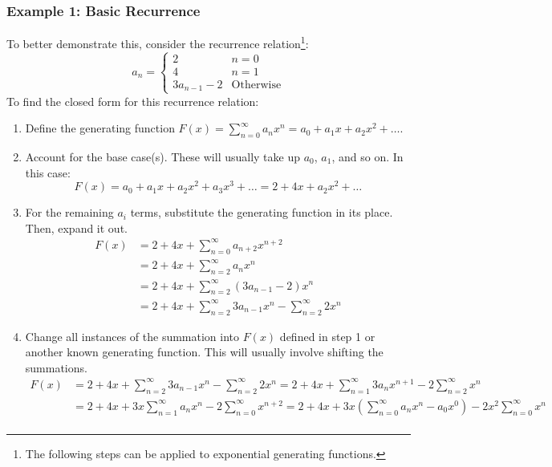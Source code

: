 \documentclass[letterpaper]{article}
\begin{document}
\subsubsection{Example 1: Basic Recurrence}
To better demonstrate this, consider the recurrence relation\footnote{The following steps can be applied to exponential generating functions.}:
\[a_n = \begin{cases}
    2 & n = 0 \\
    4 & n = 1 \\  
    3a_{n - 1} - 2 & \text{Otherwise}
\end{cases}\]
To find the closed form for this recurrence relation: 
\begin{enumerate}[(1)]
    \item Define the generating function $F(x) = \sum_{n = 0}^{\infty} a_n x^n = a_0 + a_1 x + a_2 x^2 + \dots$. 
    \item Account for the base case(s). These will usually take up $a_0$, $a_1$, and so on. In this case:
    \[F(x) = \boxed{a_0 + a_1 x} + a_2 x^2 + a_3 x^3 + \dots = \boxed{2 + 4x} + a_2 x^2 + \dots\]
    \item For the remaining $a_i$ terms, substitute the generating function in its place. Then, expand it out. 
    \begin{equation*}
        \begin{aligned}
            F(x) &= 2 + 4x + \boxed{\sum_{n = 0}^{\infty} a_{n + 2} x^{n + 2}} \\ 
                &= 2 + 4x + \boxed{\sum_{n = 2}^{\infty} a_{n} x^{n}} \\ 
                &= 2 + 4x + \boxed{\sum_{n = 2}^{\infty} (3a_{n - 1} - 2) x^{n}} \\ 
                &= 2 + 4x + \boxed{\sum_{n = 2}^{\infty} 3a_{n - 1} x^n - \sum_{n = 2}^{\infty} 2x^n}
        \end{aligned}
    \end{equation*}
    \item Change all instances of the summation into $F(x)$ defined in step 1 or another known generating function. This will usually involve shifting the summations. 
    \begin{equation*}
        \begin{aligned}
            F(x) &= 2 + 4x + \sum_{n = 2}^{\infty} 3a_{n - 1} x^n - \sum_{n = 2}^{\infty} 2x^n = 2 + 4x + \sum_{n = 1}^{\infty} 3a_{n} x^{n + 1} - 2 \sum_{n = 2}^{\infty} x^n \\ 
                &= 2 + 4x + 3x \sum_{n = 1}^{\infty} a_{n} x^{n} - 2 \sum_{n = 0}^{\infty} x^{n + 2} = 2 + 4x + 3x \left(\sum_{n = 0}^{\infty} a_{n} x^{n} - a_0 x^0\right) - 2x^2 \sum_{n = 0}^{\infty} x^n \\ 

\end{aligned}
\end{equation*}
\end{enumerate}
\end{document}
